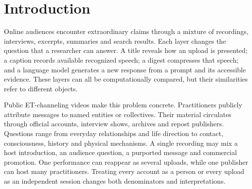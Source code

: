 \begin{abstract}
Public videos attributed to extraterrestrial (ET) channeling offer a heterogeneous record of questions, advice, cosmological claims and platform presentation. Comparing this material requires distinguishing a practitioner from a publisher, a paraphrase from a spoken turn, and a generated response from source evidence. We connect a preserved \UploadN-upload index to \QAN\ question/answer-gist candidates from \QAVideoN\ Q\&A-bearing digests, all in one Darryl Anka-related practitioner context. We audit coverage, source dependence and possible reuse, compare question and answer vocabulary, and execute a grouped-source CPU retrieval and adaptation pilot. Across \MatchedN\ matched uploads, title/caption similarity rank association is \RawRankAssociation\ before and \ConditionedRankAssociation\ after measured length conditioning; this is a descriptive sensitivity. The local pilot separately exposes lexical reconstruction, unsupported responses and source-citation failures. New collection attempts, retained derivatives and executed model outputs remain distinct in the database, dashboard and reproducible artifacts. The contribution is an inspectable measurement resource for published discourse and computational source handling. Human construct validation, rights review, authorship and submission decisions remain pending; the study does not verify attributed communication origins or physical claims.
\end{abstract}

\section{Introduction}
Online audiences encounter extraordinary claims through a mixture of recordings, interviews, excerpts, summaries and search results. Each layer changes the question that a researcher can answer. A title reveals how an upload is presented; a caption records available recognized speech; a digest compresses that speech; and a language model generates a new response from a prompt and its accessible evidence. These layers can all be computationally compared, but their similarities refer to different objects.

Public ET-channeling videos make this problem concrete. Practitioners publicly attribute messages to named entities or collectives. Their material circulates through official accounts, interview shows, archives and repost publishers. Questions range from everyday relationships and life direction to contact, consciousness, history and physical mechanisms. A single recording may mix a host introduction, an audience question, a purported message and commercial promotion. One performance can reappear as several uploads, while one publisher can host many practitioners. Treating every account as a person or every upload as an independent session changes both denominators and interpretations.

